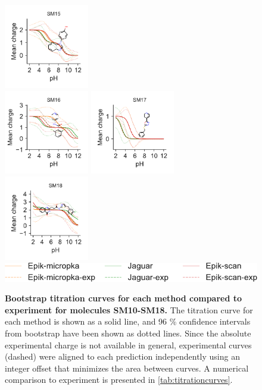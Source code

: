 \documentclass[9pt,lineno,final]{elife}
\begin{document}
\begin{figure}[hbtp]
	\includegraphics[width=0.33\textwidth]{Reports/SM15-titrationcurve-views.pdf}	 \\
	\includegraphics[width=0.33\textwidth]{Reports/SM16-titrationcurve-views.pdf}
	\includegraphics[width=0.33\textwidth]{Reports/SM17-titrationcurve-views.pdf}
	\includegraphics[width=0.33\textwidth]{Reports/SM18-titrationcurve-views.pdf}	 \\
	\includegraphics[]{Reports/overview-legend.pdf}

	\caption{{\bf Bootstrap titration curves for each method compared to experiment for molecules SM10-SM18.} The titration curve for each method is shown as a solid line, and 96 \% confidence intervals from bootstrap have been shown as dotted lines. Since the absolute experimental charge is not available in general, experimental curves (dashed) were aligned to each prediction independently using an integer offset that minimizes the area between curves. A numerical comparison to experiment is presented in \cref{tab:titrationcurves}.
	\label{fig:charge-curves2}}

\end{figure}
    
\end{document}
